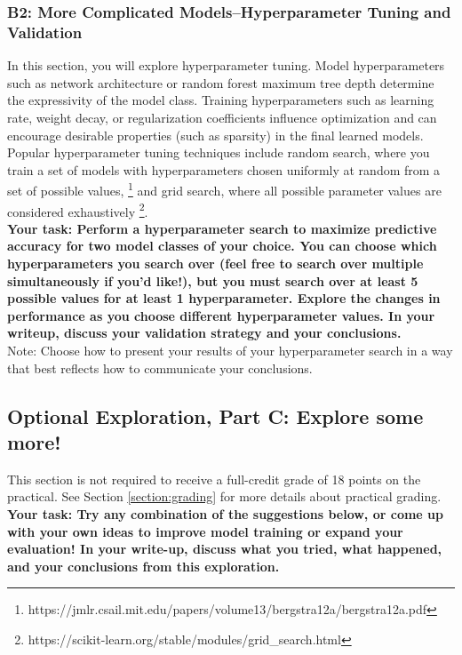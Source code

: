 \documentclass[12pt]{article}
\begin{document}
\subsubsection{B2: More Complicated Models--Hyperparameter Tuning and Validation}

In this section, you will explore hyperparameter tuning. Model hyperparameters such as network architecture or random forest maximum tree depth determine the expressivity of the model class.  Training hyperparameters such as learning rate, weight decay, or regularization coefficients influence optimization and can encourage desirable properties (such as sparsity) in the final learned models.\\

\noindent Popular hyperparameter tuning techniques include random search, where you train a set of models with hyperparameters chosen uniformly at random from a set of possible values, \footnote{https://jmlr.csail.mit.edu/papers/volume13/bergstra12a/bergstra12a.pdf} and grid search, where all possible parameter values are considered exhaustively \footnote{https://scikit-learn.org/stable/modules/grid\_search.html}.\\

\noindent \textbf{Your task: Perform a hyperparameter search to maximize predictive accuracy for two model classes of your choice.  You can choose which hyperparameters you search over (feel free to search over multiple simultaneously if you'd like!), but you must search over at least 5 possible values for at least 1 hyperparameter.  Explore the changes in performance as you choose different hyperparameter values. In your writeup, discuss your validation strategy and your conclusions.}\\

\noindent Note: Choose how to present your results of your hyperparameter search in a way that best reflects how to communicate your conclusions.

\subsection{Optional Exploration, Part C: Explore some more!}\label{section:task-exploration}

This section is not required to receive a full-credit grade of 18 points on the practical.  See Section \ref{section:grading} for more details about practical grading.
\\

\noindent \textbf{Your task: Try any combination of the suggestions below, or come up with your own ideas to improve model training or expand your evaluation!  In your write-up, discuss what you tried, what happened, and your conclusions from this exploration.}\\
\end{document}
